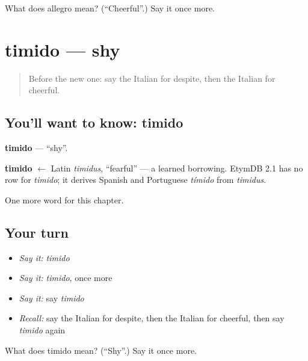 \begin{tcolorbox}[breakable,colback=teal!4,colframe=teal!35!black,title={Before you move on}]
What does allegro mean? (\textquotedblleft{}Cheerful\textquotedblright{}.) Say it once more.
\end{tcolorbox}
\section[timido]{timido — shy}

\label{lesson:IT-C189-timido}



\begin{quote}
Before the new one: say the Italian for despite, then the Italian for cheerful.
\end{quote}

\subsection*{You'll want to know: timido}
\textbf{timido} — \textquotedblleft{}shy\textquotedblright{}.

\begin{cousinweb}
\textbf{timido} $\leftarrow$ Latin \emph{timidus}, \textquotedblleft{}fearful\textquotedblright{} — a learned borrowing. EtymDB 2.1 has no row for \emph{timido}; it derives Spanish and Portuguese \emph{tímido} from \emph{timidus}.
\end{cousinweb}

\begin{grammarlens}[title={What you've built}]
One more word for this chapter.
\end{grammarlens}

\subsection*{Your turn}
\begin{itemize}
\raggedright
  \item \emph{Say it:} \emph{timido}
  \item \emph{Say it:} \emph{timido}, once more
  \item \emph{Say it:} say \emph{timido}
  \item \emph{Recall:} say the Italian for despite, then the Italian for cheerful, then say \emph{timido} again
\end{itemize}

\begin{tcolorbox}[breakable,colback=teal!4,colframe=teal!35!black,title={Before you move on}]
What does timido mean? (\textquotedblleft{}Shy\textquotedblright{}.) Say it once more.
\end{tcolorbox}
